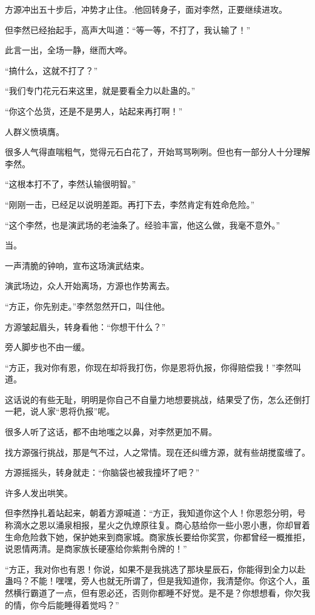 
\begin{this_body}

方源冲出五十步后，冲势才止住。.他回转身子，面对李然，正要继续进攻。

但李然已经抬起手，高声大叫道：“等一等，不打了，我认输了！”

此言一出，全场一静，继而大哗。

“搞什么，这就不打了？”

“我们专门花元石来这里，就是要看全力以赴蛊的。”

“你这个怂货，还是不是男人，站起来再打啊！”

人群义愤填膺。

很多人气得直喘粗气，觉得元石白花了，开始骂骂咧咧。但也有一部分人十分理解李然。

“这根本打不了，李然认输很明智。”

“刚刚一击，已经足以说明差距。再打下去，李然肯定有姓命危险。”

“这个李然，也是演武场的老油条了。经验丰富，他这么做，我毫不意外。”

当。

一声清脆的钟响，宣布这场演武结束。

演武场边，众人开始离场，方源也作势离去。

“方正，你先别走。”李然忽然开口，叫住他。

方源皱起眉头，转身看他：“你想干什么？”

旁人脚步也不由一缓。

“方正，我对你有恩，你现在却将我打伤，你是恩将仇报，你得赔偿我！”李然叫道。

这话说的有些无耻，明明是你自己不自量力地想要挑战，结果受了伤，怎么还倒打一耙，说人家“恩将仇报”呢。

很多人听了这话，都不由地嗤之以鼻，对李然更加不屑。

找方源强行挑战，那是气不过，人之常情。现在还纠缠方源，就有些胡搅蛮缠了。

方源摇摇头，转身就走：“你脑袋也被我撞坏了吧？”

许多人发出哄笑。

但李然挣扎着站起来，朝着方源喊道：“方正，我知道你这个人！你恩怨分明，号称滴水之恩以涌泉相报，星火之仇燎原往复。商心慈给你一些小恩小惠，你却冒着生命危险救下她，保护她来到商家城。商家族长要给你奖赏，你都曾经一概推拒，说恩情两清。是商家族长硬塞给你紫荆令牌的！”

“方正，我对你也有恩！你说，如果不是我挑选了那块星辰石，你能得到全力以赴蛊吗？不能！嘿嘿，旁人也就无所谓了，但是我知道你，我清楚你。你这个人，虽然横行霸道了一点，但有恩必还，否则你都睡不好觉。是不是？你想想看，你欠我的情，你今后能睡得着觉吗？”


\end{this_body}

